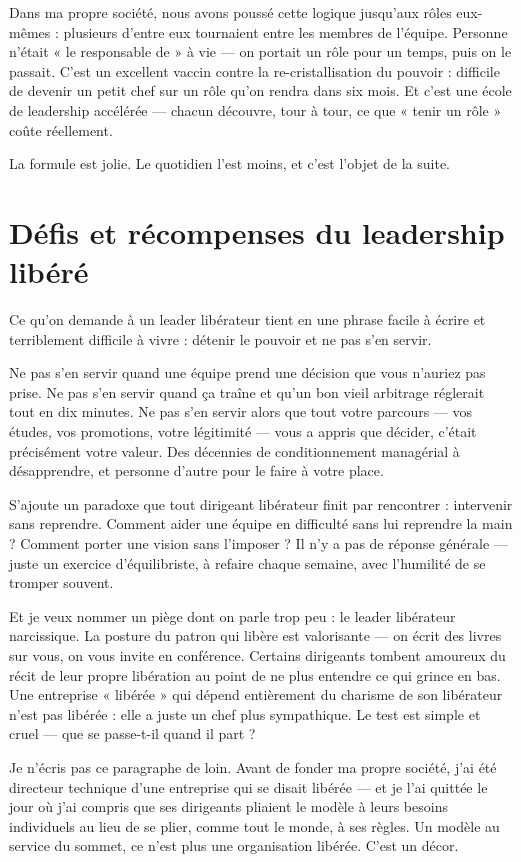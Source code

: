 Dans ma propre société, nous avons poussé cette logique jusqu'aux rôles eux-mêmes : plusieurs d'entre eux tournaient entre les membres de l'équipe. Personne n'était « le responsable de » à vie — on portait un rôle pour un temps, puis on le passait. C'est un excellent vaccin contre la re-cristallisation du pouvoir : difficile de devenir un petit chef sur un rôle qu'on rendra dans six mois. Et c'est une école de leadership accélérée — chacun découvre, tour à tour, ce que « tenir un rôle » coûte réellement.

La formule est jolie. Le quotidien l'est moins, et c'est l'objet de la suite.

\section{Défis et récompenses du leadership libéré}

Ce qu'on demande à un leader libérateur tient en une phrase facile à écrire et terriblement difficile à vivre : détenir le pouvoir et ne pas s'en servir.

Ne pas s'en servir quand une équipe prend une décision que vous n'auriez pas prise. Ne pas s'en servir quand ça traîne et qu'un bon vieil arbitrage réglerait tout en dix minutes. Ne pas s'en servir alors que tout votre parcours — vos études, vos promotions, votre légitimité — vous a appris que décider, c'était précisément votre valeur. Des décennies de conditionnement managérial à désapprendre, et personne d'autre pour le faire à votre place.

S'ajoute un paradoxe que tout dirigeant libérateur finit par rencontrer : intervenir sans reprendre. Comment aider une équipe en difficulté sans lui reprendre la main ? Comment porter une vision sans l'imposer ? Il n'y a pas de réponse générale — juste un exercice d'équilibriste, à refaire chaque semaine, avec l'humilité de se tromper souvent.

Et je veux nommer un piège dont on parle trop peu : le leader libérateur narcissique. La posture du patron qui libère est valorisante — on écrit des livres sur vous, on vous invite en conférence. Certains dirigeants tombent amoureux du récit de leur propre libération au point de ne plus entendre ce qui grince en bas. Une entreprise « libérée » qui dépend entièrement du charisme de son libérateur n'est pas libérée : elle a juste un chef plus sympathique. Le test est simple et cruel — que se passe-t-il quand il part ?

Je n'écris pas ce paragraphe de loin. Avant de fonder ma propre société, j'ai été directeur technique d'une entreprise qui se disait libérée — et je l'ai quittée le jour où j'ai compris que ses dirigeants pliaient le modèle à leurs besoins individuels au lieu de se plier, comme tout le monde, à ses règles. Un modèle au service du sommet, ce n'est plus une organisation libérée. C'est un décor.

